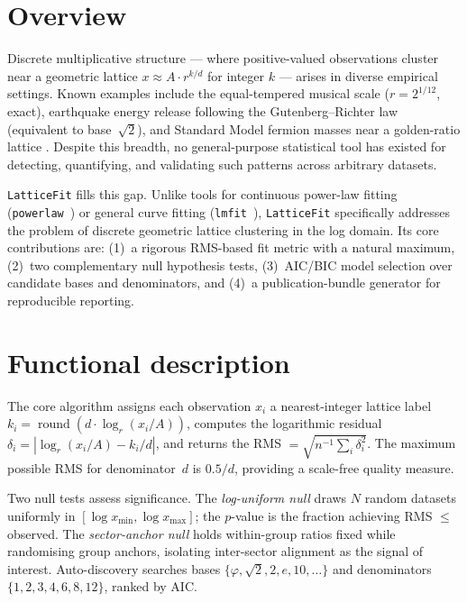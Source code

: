 \documentclass[10pt,a4paper]{article}
\begin{document}
\section{Overview}

Discrete multiplicative structure --- where positive-valued observations
cluster near a geometric lattice $x \approx A \cdot r^{k/d}$ for
integer $k$ --- arises in diverse empirical settings. Known examples
include the equal-tempered musical scale ($r = 2^{1/12}$, exact),
earthquake energy release following the Gutenberg--Richter law
\cite{GutenbergRichter1944} (equivalent to base~$\sqrt{2}$), and
Standard Model fermion masses near a golden-ratio lattice
\cite{Gentry2026masses}. Despite this breadth, no general-purpose
statistical tool has existed for detecting, quantifying, and validating
such patterns across arbitrary datasets.

\texttt{LatticeFit} fills this gap. Unlike tools for continuous power-law
fitting (\texttt{powerlaw}~\cite{powerlaw}) or general curve fitting
(\texttt{lmfit}~\cite{lmfit}), \texttt{LatticeFit} specifically addresses
the problem of discrete geometric lattice clustering in the log domain.
Its core contributions are: (1)~a rigorous RMS-based fit metric with a
natural maximum, (2)~two complementary null hypothesis tests, (3)~AIC/BIC
model selection over candidate bases and denominators, and (4)~a
publication-bundle generator for reproducible reporting.

\section{Functional description}

The core algorithm assigns each observation $x_i$ a nearest-integer
lattice label $k_i = \operatorname{round}(d \cdot \log_r(x_i/A))$,
computes the logarithmic residual $\delta_i = |\log_r(x_i/A) - k_i/d|$,
and returns the RMS $= \sqrt{n^{-1}\sum_i \delta_i^2}$.
The maximum possible RMS for denominator~$d$ is $0.5/d$, providing
a scale-free quality measure.

Two null tests assess significance. The \emph{log-uniform null}
draws $N$ random datasets uniformly in $[\log x_{\min}, \log x_{\max}]$;
the $p$-value is the fraction achieving RMS $\leq$ observed.
The \emph{sector-anchor null} holds within-group ratios fixed while
randomising group anchors, isolating inter-sector alignment as the
signal of interest. Auto-discovery searches bases
$\{\varphi, \sqrt{2}, 2, e, 10, \ldots\}$ and denominators
$\{1,2,3,4,6,8,12\}$, ranked by AIC.
\end{document}

